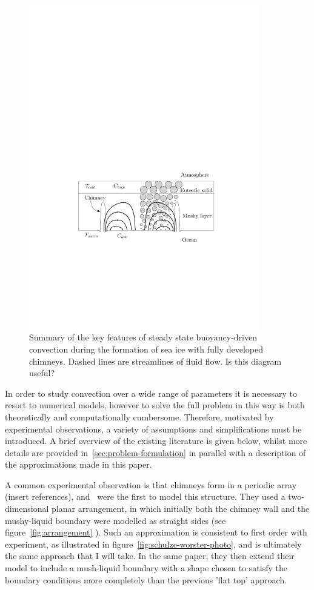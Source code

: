 \documentclass[11pt]{proc}
\begin{document}
\begin{figure}[t]
\centering
    \includegraphics[width=10cm]{convection-in-sea-ice.pdf}
    \caption{Summary of the key features of steady state buoyancy-driven convection during the formation of sea ice with fully developed chimneys. Dashed lines are streamlines of fluid flow. Is this diagram useful?}
    \label{fig:convection-in-sea-ice}
\end{figure}


In order to study convection over a wide range of parameters it is necessary to resort to numerical models, however to solve the full problem in this way is both theoretically and computationally cumbersome. Therefore, motivated by experimental observations, a variety of assumptions and simplifications must be introduced. A brief overview of the existing literature is given below, whilst more details are provided in~\autoref{sec:problem-formulation} in parallel with a description of the approximations made in this paper.

A common experimental observation is that chimneys form in a periodic array (insert references), and~\citet*{schulze-worster-98} were the first to model this structure. They used a two-dimensional planar arrangement, in which initially both the chimney wall and the mushy-liquid boundary were modelled as straight sides (see figure~\ref{fig:arrangement} ). Such an approximation is consistent to first order with experiment, as illustrated in figure~\ref{fig:schulze-worster-photo}, and is ultimately the same approach that I will take. In the same paper, they then extend their model to include a mush-liquid boundary with a shape chosen to satisfy the boundary conditions more completely than the previous 'flat top' approach.
\end{document}
